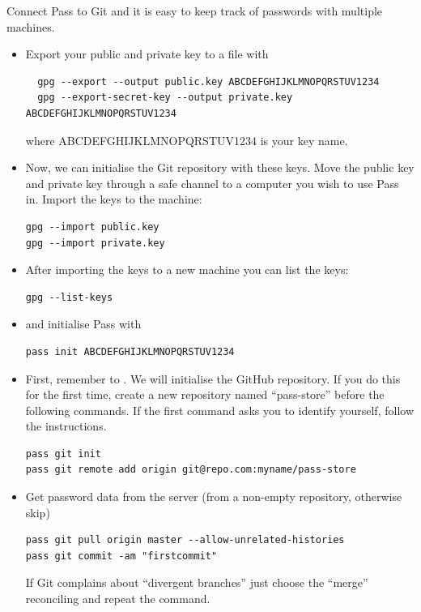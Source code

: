 \documentclass{article}
\begin{document}
Connect Pass to Git and it is easy to keep track of passwords with multiple machines.
\begin{itemize}
\item Export your public and private key to a file with \\
\begin{verbatim}
  gpg --export --output public.key ABCDEFGHIJKLMNOPQRSTUV1234 
  gpg --export-secret-key --output private.key ABCDEFGHIJKLMNOPQRSTUV1234
\end{verbatim}
where ABCDEFGHIJKLMNOPQRSTUV1234 is your key name.\\
\item Now, we can initialise the Git repository with these keys. Move the public key and private key through a safe channel to a computer you wish to use Pass in. Import the keys to the machine: \\
\begin{verbatim}
gpg --import public.key
gpg --import private.key
\end{verbatim}
\item After importing the keys to a new machine you can list the keys:
\begin{verbatim}
gpg --list-keys 
\end{verbatim}
\item and initialise Pass with
\begin{verbatim}
pass init ABCDEFGHIJKLMNOPQRSTUV1234
\end{verbatim}
\item First, remember to . We will initialise the GitHub repository. If you do this for the first time, create a new repository named ``pass-store'' before the following commands. If the first command asks you to identify yourself, follow the instructions.
\begin{verbatim}
pass git init 
pass git remote add origin git@repo.com:myname/pass-store
\end{verbatim}
\item Get password data from the server (from a non-empty repository, otherwise skip)
\begin{verbatim}
pass git pull origin master --allow-unrelated-histories
pass git commit -am "firstcommit"
\end{verbatim}
If Git complains about ``divergent branches'' just choose the ``merge'' reconciling and repeat the command.

\end{itemize}
\end{document}
